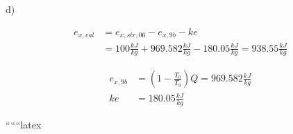 d)

\begin{align*}
e_{x,val} &= e_{x,str,06} - e_{x,9b} - ke \\
&= 100 \frac{kJ}{kg} + 969.582 \frac{kJ}{kg} - 180.05 \frac{kJ}{kg} = 938.55 \frac{kJ}{kg}
\end{align*}

\begin{align*}
e_{x,9b} &= \left( 1 - \frac{T_0}{T_9} \right) Q = 969.582 \frac{kJ}{kg} \\
ke &= 180.05 \frac{kJ}{kg}
\end{align*}

``````latex